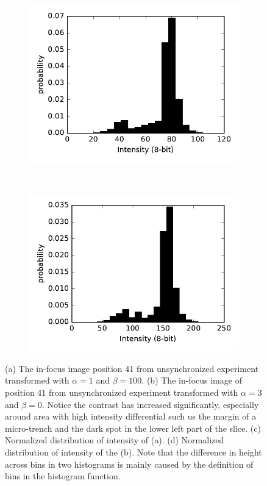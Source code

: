 \documentclass[pdftex,12pt,a4paper]{report}
\begin{document}
\begin{figure}[H]
\centering

\begin{subfigure}{0.4\textwidth}
  \centering
  \includegraphics[width=\textwidth]{images/pos_41_in_t0_br_up100_hist}
  \caption{}
  \label{fig:pos41_brup100_hist}
\end{subfigure}%
~
\begin{subfigure}{0.4\textwidth}
  \centering
  \includegraphics[width=\textwidth]{images/pos_41_in_t0_br_times3_hist}
  \caption{}
  \label{fig:pos41_times3_hist}
\end{subfigure}%

\caption[Brightness and contrast transformation]{(a) The in-focus image position 41 from unsynchronized experiment transformed with $\alpha=1$ and $\beta = 100$. (b) The in-focus image of position 41 from unsynchronized experiment transformed with $\alpha=3$ and $\beta = 0$. Notice the contrast has increased significantly, especially around area with high intensity differential such us the margin of a micro-trench and the dark spot in the lower left part of the slice. (c) Normalized distribution of intensity of (a). (d) Normalized distribution of intensity of the (b). Note that the difference in height across bins in two histograms is mainly caused by the definition of bins in the histogram function.}

\label{fig:pos41_brup100}
\end{figure}
\end{document}
